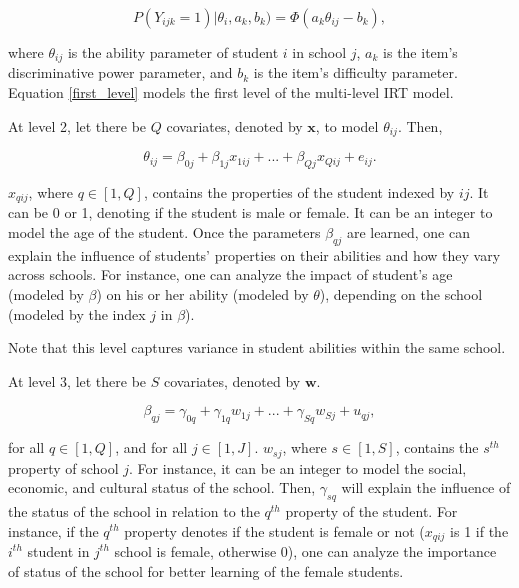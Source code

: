 \documentclass[12pt]{article}
\begin{document}
\begin{equation}\label{first_level}
    P(Y_{ijk}=1) | \theta_i, a_k, b_k) = \Phi(a_k \theta_{ij} - b_k),
\end{equation}

where $\theta_{ij}$ is the ability parameter of student $i$ in school $j$, $a_k$ is the item's discriminative power parameter, and $b_k$ is the item's difficulty parameter. Equation \eqref{first_level} models the first level of the multi-level IRT model.

At level 2, let there be $Q$ covariates, denoted by $\boldsymbol{x}$, to model $\theta_{ij}$. Then,

\begin{equation}\label{second_level}
    \theta_{ij} = \beta_{0j} + \beta_{1j}x_{1ij} + ... + \beta_{Qj}x_{Qij} + e_{ij}.
\end{equation}

$x_{qij}$, where $q \in [1, Q]$, contains the properties of the student indexed by $ij$. It can be 0 or 1, denoting if the student is male or female. It can be an integer to model the age of the student. Once the parameters $\beta_{qj}$ are learned, one can explain the influence of students' properties on their abilities and how they vary across schools. For instance, one can analyze the impact of student's age (modeled by $\beta$) on his or her ability (modeled by $\theta$), depending on the school (modeled by the index $j$ in $\beta$).

Note that this level captures variance in student abilities within the same school.

At level 3, let there be $S$ covariates, denoted by $\boldsymbol{w}$.

\begin{equation}
    \beta_{qj} = \gamma_{0q} + \gamma_{1q}w_{1j} + ... + \gamma_{Sq}w_{Sj} + u_{qj},
\end{equation}

for all $q \in [1, Q]$, and for all $ j \in [1, J]$. $w_{sj}$, where $s \in [1, S]$, contains the $s^{th}$ property of school $j$. For instance, it can be an integer to model the social, economic, and cultural status of the school. Then, $\gamma_{sq}$ will explain the influence of the status of the school in relation to the $q^{th}$ property of the student. For instance, if the $q^{th}$ property denotes if the student is female or not ($x_{qij}$ is 1 if the $i^{th}$ student in $j^{th}$ school is female, otherwise 0), one can analyze the importance of status of the school for better learning of the female students.
\end{document}
